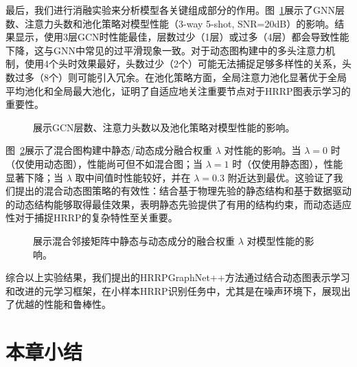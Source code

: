 最后，我们进行消融实验来分析模型各关键组成部分的作用。图~\ref{fig:ablation_arch_chap3}展示了GNN层数、注意力头数和池化策略对模型性能（3-way 5-shot, SNR=20dB）的影响。结果显示，使用3层GCN时性能最佳，层数过少（1层）或过多（4层）都会导致性能下降，这与GNN中常见的过平滑现象一致。对于动态图构建中的多头注意力机制，使用4个头时效果最好，头数过少（2个）可能无法捕捉足够多样性的关系，头数过多（8个）则可能引入冗余。在池化策略方面，全局注意力池化显著优于全局平均池化和全局最大池化，证明了自适应地关注重要节点对于HRRP图表示学习的重要性。

\begin{figure}[h!]
    \centering
    \caption{展示GCN层数、注意力头数以及池化策略对模型性能的影响。}
    \label{fig:ablation_arch_chap3}
\end{figure}

图~\ref{fig:ablation_lambda_chap3}展示了混合图构建中静态/动态成分融合权重 $\lambda$ 对性能的影响。当 $\lambda=0$ 时（仅使用动态图），性能尚可但不如混合图；当 $\lambda=1$ 时（仅使用静态图），性能显著下降；当 $\lambda$ 取中间值时性能较好，并在 $\lambda=0.3$ 附近达到最优。这验证了我们提出的混合动态图策略的有效性：结合基于物理先验的静态结构和基于数据驱动的动态结构能够取得最佳效果，表明静态先验提供了有用的结构约束，而动态适应性对于捕捉HRRP的复杂特性至关重要。

\begin{figure}[h!]
    \centering
    \caption{展示混合邻接矩阵中静态与动态成分的融合权重 $\lambda$ 对模型性能的影响。}
    \label{fig:ablation_lambda_chap3}
\end{figure}

综合以上实验结果，我们提出的HRRPGraphNet++方法通过结合动态图表示学习和改进的元学习框架，在小样本HRRP识别任务中，尤其是在噪声环境下，展现出了优越的性能和鲁棒性。

\section{本章小结}
\label{sec:noise_summary}

